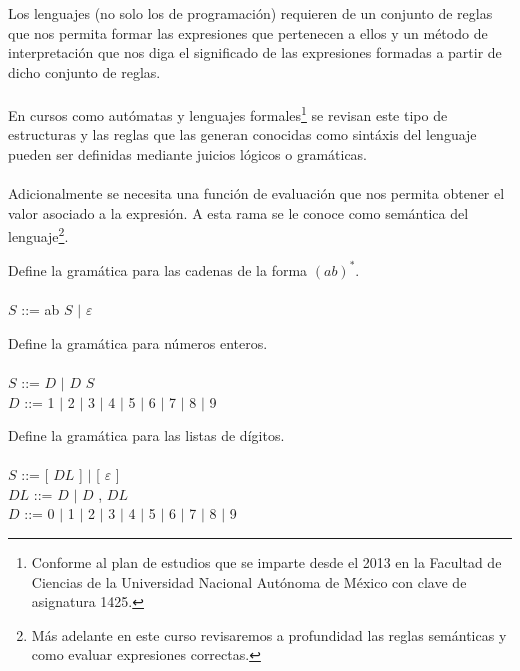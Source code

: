    Los lenguajes (no solo los de programación) requieren de un conjunto de reglas que nos permita formar las expresiones que pertenecen a ellos y un método de interpretación que nos diga el significado de las expresiones formadas a partir de dicho conjunto de reglas.\\\\
    En cursos como autómatas y lenguajes formales\footnote{Conforme al plan de estudios que se imparte desde el 2013 en la Facultad de Ciencias de la Universidad Nacional Autónoma de México con clave de asignatura 1425. } se revisan este tipo de estructuras y las reglas que las generan conocidas como sintáxis del  lenguaje pueden ser definidas mediante juicios lógicos o gramáticas. \\\\
    Adicionalmente se necesita una función de evaluación que nos permita obtener el valor asociado a la expresión. A esta rama se le conoce como semántica del lenguaje\footnote{
    Más adelante en este curso revisaremos a profundidad las reglas semánticas y como evaluar expresiones correctas.}.

    \begin{exercise}
        Define la gramática para las cadenas de la forma $(ab)^*$.     \\\\
            $S$ ::= ab $S$ $|$ $\varepsilon$
    \end{exercise}

    \begin{exercise}
        Define la gramática para números enteros.  \\\\
            $S$ ::= $D$ $|$ $D$ $S$     \\
            $D$ ::= 1 $|$ 2 $|$ 3 $|$ 4 $|$ 5 $|$ 6 $|$ 7 $|$ 8 $|$ 9
    \end{exercise}


    \begin{exercise}
        Define la gramática para las listas de dígitos.     \\\\
            $S$ ::= [ $DL$ ] $|$ [ $\varepsilon$ ]    \\
            $DL$ ::= $D$ $|$ $D$ , $DL$  \\
            $D$ ::= 0 $|$ 1 $|$ 2 $|$ 3 $|$ 4 $|$ 5 $|$ 6 $|$ 7 $|$ 8 $|$ 9
    \end{exercise}

